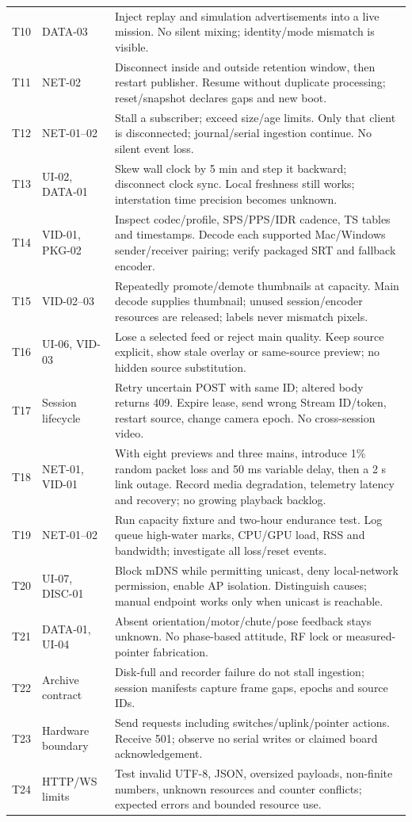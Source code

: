 \begin{longtable}{L{16mm}L{35mm}L{110mm}}
T10 & DATA-03 & Inject replay and simulation advertisements into a live mission. No silent mixing; identity/mode mismatch is visible.\\
T11 & NET-02 & Disconnect inside and outside retention window, then restart publisher. Resume without duplicate processing; reset/snapshot declares gaps and new boot.\\
T12 & NET-01--02 & Stall a subscriber; exceed size/age limits. Only that client is disconnected; journal/serial ingestion continue. No silent event loss.\\
T13 & UI-02, DATA-01 & Skew wall clock by 5 min and step it backward; disconnect clock sync. Local freshness still works; interstation time precision becomes unknown.\\
T14 & VID-01, PKG-02 & Inspect codec/profile, SPS/PPS/IDR cadence, TS tables and timestamps. Decode each supported Mac/Windows sender/receiver pairing; verify packaged SRT and fallback encoder.\\
T15 & VID-02--03 & Repeatedly promote/demote thumbnails at capacity. Main decode supplies thumbnail; unused session/encoder resources are released; labels never mismatch pixels.\\
T16 & UI-06, VID-03 & Lose a selected feed or reject main quality. Keep source explicit, show stale overlay or same-source preview; no hidden source substitution.\\
T17 & Session lifecycle & Retry uncertain POST with same ID; altered body returns 409. Expire lease, send wrong Stream ID/token, restart source, change camera epoch. No cross-session video.\\
T18 & NET-01, VID-01 & With eight previews and three mains, introduce 1\% random packet loss and 50 ms variable delay, then a 2 s link outage. Record media degradation, telemetry latency and recovery; no growing playback backlog.\\
T19 & NET-01--02 & Run capacity fixture and two-hour endurance test. Log queue high-water marks, CPU/GPU load, RSS and bandwidth; investigate all loss/reset events.\\
T20 & UI-07, DISC-01 & Block mDNS while permitting unicast, deny local-network permission, enable AP isolation. Distinguish causes; manual endpoint works only when unicast is reachable.\\
T21 & DATA-01, UI-04 & Absent orientation/motor/chute/pose feedback stays unknown. No phase-based attitude, RF lock or measured-pointer fabrication.\\
T22 & Archive contract & Disk-full and recorder failure do not stall ingestion; session manifests capture frame gaps, epochs and source IDs.\\
T23 & Hardware boundary & Send  requests including switches/uplink/pointer actions. Receive 501; observe no serial writes or claimed board acknowledgement.\\
T24 & HTTP/WS limits & Test invalid UTF-8, JSON, oversized payloads, non-finite numbers, unknown resources and counter conflicts; expected errors and bounded resource use.\\
\bottomrule
\end{longtable}

